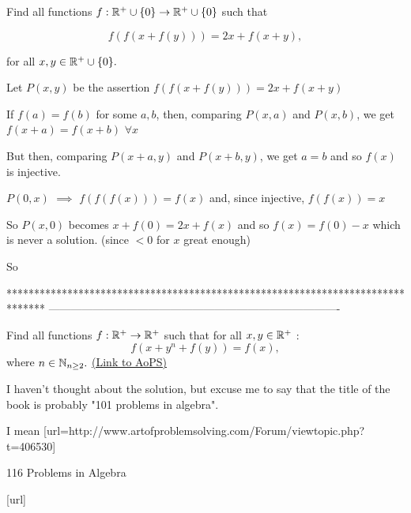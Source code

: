 \begin{solution}
	\begin{tcolorbox}Find all functions $f:\Bbb{R}^+\cup\{0\}\to \Bbb{R}^+\cup\{0\}$ such that 

\[f(f(x+f(y)))=2x+f(x+y), \]

for all $x,y \in \Bbb{R}^+\cup\{0\}.$\end{tcolorbox}
Let $P(x,y)$ be the assertion $f(f(x+f(y)))=2x+f(x+y)$

If $f(a)=f(b)$ for some $a,b$, then, comparing $P(x,a)$ and $P(x,b)$, we get $f(x+a)=f(x+b)$ $\forall x$

But then, comparing $P(x+a,y)$ and $P(x+b,y)$, we get $a=b$ and so $f(x)$ is injective.

$P(0,x)$ $\implies$ $f(f(f(x)))=f(x)$ and, since injective, $f(f(x))=x$

So $P(x,0)$ becomes $x+f(0)=2x+f(x)$ and so $f(x)=f(0)-x$ which is never a solution. (since $<0$ for $x$ great enough)

So 
\end{solution}
*******************************************************************************
-------------------------------------------------------------------------------

\begin{problem}
	Find all functions $f:\Bbb{R}^+\to\Bbb{R}^+$ such that for all $x,y \in \Bbb{R}^+$ : 
\[f(x+y^n+f(y))=f(x), \]
where $n\in \Bbb{N}_{n\geq 2}.$
	\flushright \href{https://artofproblemsolving.com/community/c6h444698}{(Link to AoPS)}
\end{problem}



\begin{solution}
	I haven't thought about the solution, but excuse me to say that the title of the book is probably "101 problems in algebra".
\end{solution}



\begin{solution}
	I mean [url=http://www.artofproblemsolving.com/Forum/viewtopic.php?t=406530]\begin{bolded}116 Problems in Algebra\end{bolded}[\/url]
\end{solution}



